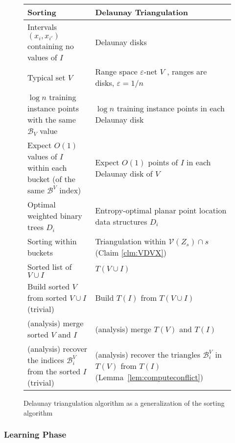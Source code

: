 \documentclass{siamltex}
\newcommand{\cV}{\mathcal{V}}
\newcommand{\eps}{\varepsilon}
\newcommand{\pred}{\mathcal{B}}
\newcommand{\tsearch}{\mathcal{B}}
\begin{document}
\begin{figure}
\begin{center}
\begin{tabular}{|p{170pt}|p{170pt}|}
    
    \hline   Sorting
            & Delaunay Triangulation
    \\ \hline Intervals $(x_i, x_{i'})$ containing no values of $I$
            & Delaunay disks
    \\ \hline Typical set $V$
            &Range space $\eps$-net $V$ \cite{MSW,CV}, ranges are disks, 
	    $\eps = 1/n$
    \\ \hline $\log n$ training instance points with the same $\pred_V$ value
            & $\log n$ training instance points in each Delaunay disk
    \\ \hline Expect $O(1)$ values of  $I$ within each bucket 
    (of the same $\pred^V$ index)
            & Expect $O(1)$ points of $I$ in each Delaunay disk of $V$
    \\ \hline Optimal weighted binary trees $D_i$
            & Entropy-optimal planar point location data structures 
	    $D_i$ \cite{AMM}
    \\ \hline Sorting within buckets
            & Triangulation within $\cV(Z_s) \cap s$ 
	    (Claim \ref{clm:VDVX})
    \\ \hline Sorted list of $V \cup I$
            & $T(V \cup I)$
    \\ \hline Build sorted $V$ from sorted $V \cup I$ (trivial)
            & Build $T(I)$ from $T(V \cup I)$ \cite{CDH+,ChazelleMu09}
    \\ \hline (analysis) merge sorted $V$ and $I$
            & (analysis) merge $T(V)$ and $T(I)$ \cite{C}
    \\ \hline (analysis) recover the indices $\pred^V_i$ from the sorted $I$ 
    (trivial)
            & (analysis) recover the triangles $\tsearch^V_i$ in $T(V)$ 
	    from $T(I)$ (Lemma~\ref{lem:computeconflict})
    \\ \hline
\end{tabular}
\end{center}
\caption{Delaunay triangulation algorithm as a generalization of the 
sorting algorithm}
\label{fig:analogies}
\end{figure}

\subsubsection{Learning Phase}\label{sec:learning}
\end{document}
